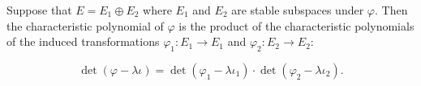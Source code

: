 Suppose that $E = E_1 \oplus E_2$ where $E_1$ and $E_2$ are stable subspaces under $\varphi$. Then the characteristic polynomial of $\varphi$ is the product of the characteristic polynomials of the induced transformations $\varphi_1: E_1 \to E_1$ and $\varphi_2: E_2 \to E_2$:

$$\det(\varphi - \lambda \iota) = \det(\varphi_1 - \lambda \iota_1) \cdot \det(\varphi_2 - \lambda \iota_2).$$

